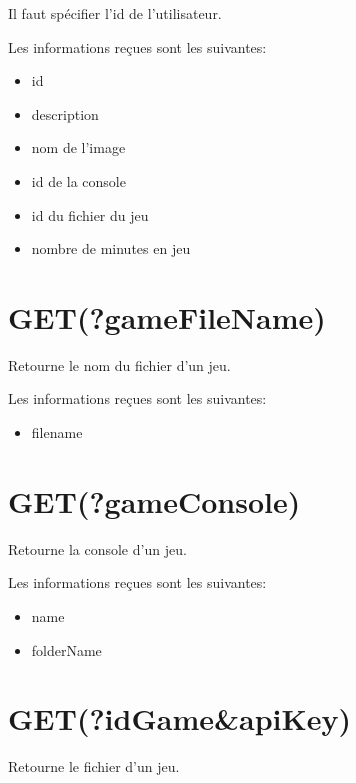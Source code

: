 \documentclass[a4paper,12pt,french]{sphinxmanual}
\begin{document}
\sphinxAtStartPar
Il faut spécifier l’id de l’utilisateur.

\sphinxAtStartPar
Les informations reçues sont les suivantes:
\begin{itemize}
\item {} 
\sphinxAtStartPar
id

\item {} 
\sphinxAtStartPar
description

\item {} 
\sphinxAtStartPar
nom de l’image

\item {} 
\sphinxAtStartPar
id de la console

\item {} 
\sphinxAtStartPar
id du fichier du jeu

\item {} 
\sphinxAtStartPar
nombre de minutes en jeu

\end{itemize}


\section{GET(?gameFileName)}
\label{\detokenize{fonctionnelleAPI:get-gamefilename}}
\sphinxAtStartPar
Retourne le nom du fichier d’un jeu.

\sphinxAtStartPar
Les informations reçues sont les suivantes:
\begin{itemize}
\item {} 
\sphinxAtStartPar
filename

\end{itemize}


\section{GET(?gameConsole)}
\label{\detokenize{fonctionnelleAPI:get-gameconsole}}
\sphinxAtStartPar
Retourne la console d’un jeu.

\sphinxAtStartPar
Les informations reçues sont les suivantes:
\begin{itemize}
\item {} 
\sphinxAtStartPar
name

\item {} 
\sphinxAtStartPar
folderName

\end{itemize}


\section{GET(?idGame\&apiKey)}
\label{\detokenize{fonctionnelleAPI:get-idgame-apikey}}
\sphinxAtStartPar
Retourne le fichier d’un jeu.
\end{document}
